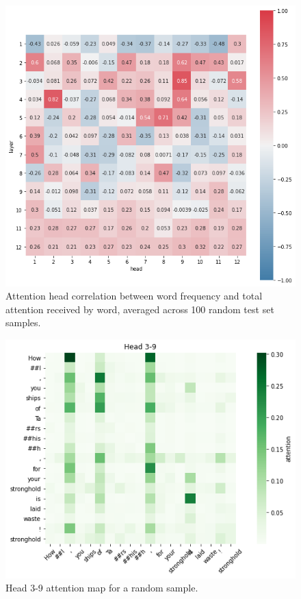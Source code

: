 \documentclass[11pt,a4paper]{article}
\begin{document}
\begin{figure}
  \centering
  \includegraphics[scale=0.375]{head_correlations_tf.png}
  \captionsetup{justification=centering}
  \caption{\label{fig:head_correlations_tf} Attention head correlation between word frequency and total attention received by word, averaged across 100 random test set samples.}
\end{figure}

\begin{figure}
  \centering
  \includegraphics[scale=0.45]{head_3-9.png}
  \captionsetup{justification=centering}
  \caption{\label{fig:head_3-9} Head 3-9 attention map for a random sample.}
\end{figure}
\end{document}
